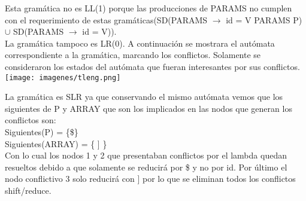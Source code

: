 Esta gramática no es LL(1) porque las producciones de PARAMS no cumplen con el
requerimiento de estas gramáticas(SD(PARAMS $\rightarrow$ id = V PARAMS P) $\cup$ SD(PARAMS $\rightarrow$ id = V)).\\

La gramática tampoco es LR(0). A continuación se mostrara el autómata correspondiente a la gramática, marcando los conflictos.
Solamente se consideraron los estados del autómata que fueran interesantes por sus conflictos.\\

\texttt{[image: imagenes/tleng.png]}


La gramática es SLR ya que conservando el mismo autómata vemos que los siguientes de P y ARRAY que son los implicados en
las nodos que generan los conflictos son:\\

Siguientes(P) = \{\$\}\\
Siguientes(ARRAY) = \{ ] \}\\

Con lo cual los nodos 1 y 2 que presentaban conflictos por el lambda quedan resueltos debido a que solamente se reducirá por
\$ y no por id. Por último el nodo conflictivo 3 solo reducirá con ] por lo que se eliminan todos los conflictos shift/reduce.

